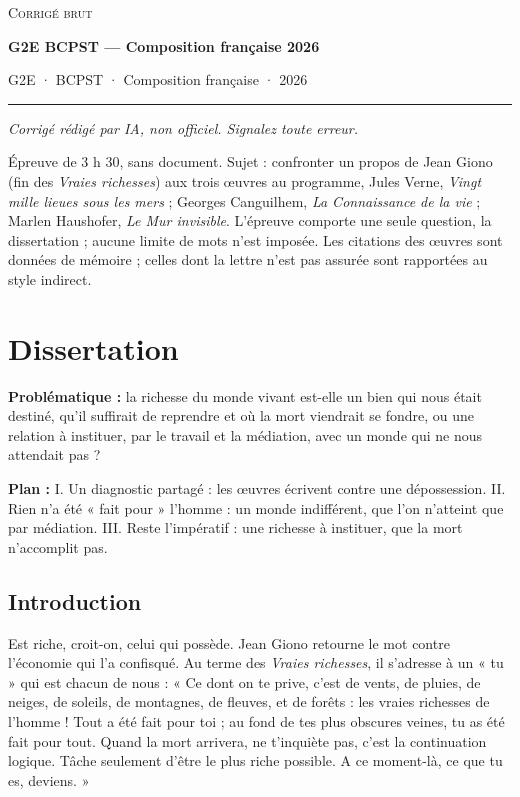 \documentclass[11pt,a4paper]{article}
\begin{document}
\thispagestyle{plain}
\begin{center}
  {\small\scshape Corrigé brut}\par\smallskip
  {\LARGE\bfseries G2E BCPST — Composition française 2026\par}\medskip
  {\large G2E · BCPST · Composition française · 2026\par}
\end{center}
\vspace{2pt}\hrule\vspace{8pt}

\emph{Corrigé rédigé par IA, non officiel. Signalez toute erreur.}

Épreuve de 3 h 30, sans document. Sujet : confronter un propos de Jean Giono (fin des \emph{Vraies richesses}) aux trois œuvres au programme, Jules Verne, \emph{Vingt mille lieues sous les mers} ; Georges Canguilhem, \emph{La Connaissance de la vie} ; Marlen Haushofer, \emph{Le Mur invisible}. L'épreuve comporte une seule question, la dissertation ; aucune limite de mots n'est imposée. Les citations des œuvres sont données de mémoire ; celles dont la lettre n'est pas assurée sont rapportées au style indirect.

\hypertarget{dissertation}{%
\section{Dissertation}\label{dissertation}}

\textbf{Problématique :} la richesse du monde vivant est-elle un bien qui nous était destiné, qu'il suffirait de reprendre et où la mort viendrait se fondre, ou une relation à instituer, par le travail et la médiation, avec un monde qui ne nous attendait pas ?

\textbf{Plan :} I. Un diagnostic partagé : les œuvres écrivent contre une dépossession. II. Rien n'a été « fait pour » l'homme : un monde indifférent, que l'on n'atteint que par médiation. III. Reste l'impératif : une richesse à instituer, que la mort n'accomplit pas.

\hypertarget{introduction}{%
\subsection{Introduction}\label{introduction}}

Est riche, croit-on, celui qui possède. Jean Giono retourne le mot contre l'économie qui l'a confisqué. Au terme des \emph{Vraies richesses}, il s'adresse à un « tu » qui est chacun de nous : « Ce dont on te prive, c'est de vents, de pluies, de neiges, de soleils, de montagnes, de fleuves, et de forêts : les vraies richesses de l'homme ! Tout a été fait pour toi ; au fond de tes plus obscures veines, tu as été fait pour tout. Quand la mort arrivera, ne t'inquiète pas, c'est la continuation logique. Tâche seulement d'être le plus riche possible. A ce moment-là, ce que tu es, deviens. »
\end{document}

